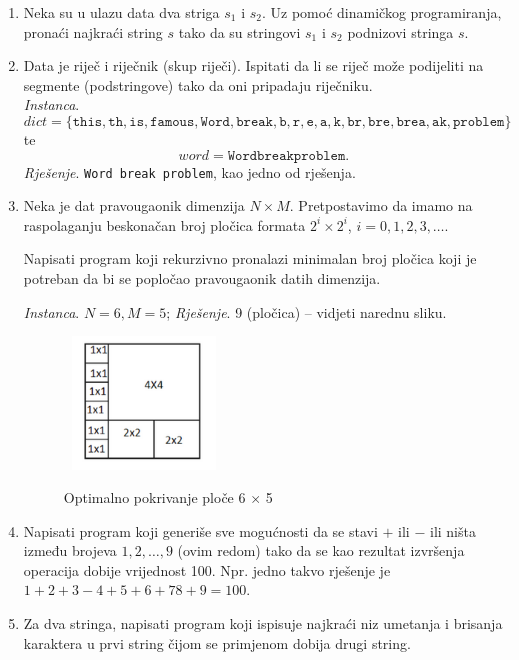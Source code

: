 \begin{enumerate}
	\item Neka su u ulazu data dva striga $s_1$ i $s_2$. Uz pomoć dinamičkog programiranja, pronaći najkraći string $s$ tako da
	su stringovi $s_1$ i $s_2$ podnizovi stringa $s$.
	\item  Data  je riječ i riječnik (skup riječi). Ispitati da li se riječ može podijeliti na segmente (podstringove) tako da oni pripadaju riječniku. \\
	
	\textit{Instanca}. $$dict = \{\texttt{this}, \texttt{th}, \texttt{is}, \texttt{famous}, \texttt{Word}, \texttt{break}, \texttt{b}, \texttt{r}, \texttt{e}, \texttt{a}, \texttt{k},	\texttt{br}, \texttt{bre}, \texttt{brea}, \texttt{ak}, \texttt{problem} \} $$ te   $$word = \texttt{Wordbreakproblem}.$$  
	\textit{Rješenje}. \texttt{Word break problem},  kao jedno od rješenja.
	
	\item Neka je dat pravougaonik dimenzija $N\times M$. Pretpostavimo da imamo na raspolaganju beskonačan broj pločica
	formata $2^i \times 2^i$, $i = 0, 1, 2, 3, \ldots $. 
	
	Napisati program koji rekurzivno pronalazi minimalan broj pločica koji je potreban da bi se
	popločao pravougaonik datih dimenzija.
	
	\textit{Instanca}.  $N = 6, M=5$;	\textit{Rješenje}. 9 (pločica) -- vidjeti narednu sliku. %
	
	\begin{figure}[H]
	    \centering
		\includegraphics[width=120pt,height=100pt]{slike/plococe-dp-zadatak.png}
		\label{fig:plocice}
		\caption{Optimalno pokrivanje ploče 6 $\times$ 5}
	\end{figure}

\item Napisati program koji generiše sve mogućnosti da se stavi $+$ ili $-$ ili ništa između brojeva $1,2,\ldots,9$ (ovim redom) tako da se kao rezultat izvršenja operacija dobije vrijednost 100. Npr. jedno takvo rješenje je $1 + 2 + 3 - 4 + 5 + 6 + 78 + 9 = 100$.
 
 \item Za dva stringa, napisati program koji ispisuje najkraći niz umetanja i brisanja karaktera u prvi string čijom se primjenom  dobija drugi string.
\end{enumerate}
